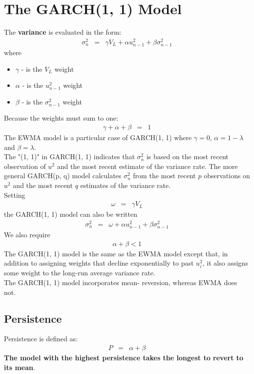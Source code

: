 \section{The GARCH(1, 1) Model}
The \textbf{\color{blue}variance} is evaluated in the form:
\begin{eqnarray}
 \sigma_{n}^{2} &=& \gamma V_{L} + \alpha u_{n - 1}^{2} + \beta\sigma_{n - 1}^{2}
\end{eqnarray}
where
\begin{itemize}
	\item $\gamma$ - is the $V_{L}$ weight
	\item $\alpha$ - is the $u_{n - 1}^{2}$ weight
	\item $\beta$ - is the $\sigma_{n - 1}^{2}$ weight
\end{itemize}
Because the weights must sum to one:
\begin{eqnarray}
	\gamma + \alpha + \beta &=& 1
\end{eqnarray}
The EWMA model is a particular case of GARCH(1, 1) where $\gamma = 0$, $\alpha = 1 - \lambda$ and $\beta = \lambda$.\\
The "(1, 1)" in GARCH(1, 1) indicates that $\sigma_{n}^{2}$ is based on the most recent observation of $u^{2}$ and the most recent estimate of the variance rate. The more general GARCH(p, q) model calculates $\sigma_{n}^{2}$ from the most recent $p$ observations on $u^{2}$ and the most recent $q$ estimates of the variance rate.\\
Setting
\begin{eqnarray}
	\omega &=& \gamma V_{L}
\end{eqnarray}
the GARCH(1, 1) model can also be written
\begin{eqnarray}
	\sigma_{n}^{2} &=& \omega + \alpha u_{n - 1}^{2} + \beta\sigma_{n - 1}^{2}
\end{eqnarray}
We also require
\begin{eqnarray}
	\alpha + \beta < 1
\end{eqnarray}
The GARCH(1, 1) model is the same as the EWMA model except that, in addition to assigning weights that decline exponentially to past $u_{i}^{2}$, it also assigns some weight to the long-run average variance rate.\\
The GARCH(1, 1) model incorporates mean- reversion, whereas EWMA does not.

\subsection{Persistence}
Persistence is defined as:
\begin{eqnarray}
	P &=& \alpha + \beta
\end{eqnarray}
\textbf{\color{blue}The model with the highest persistence takes the longest to revert to its mean}.

